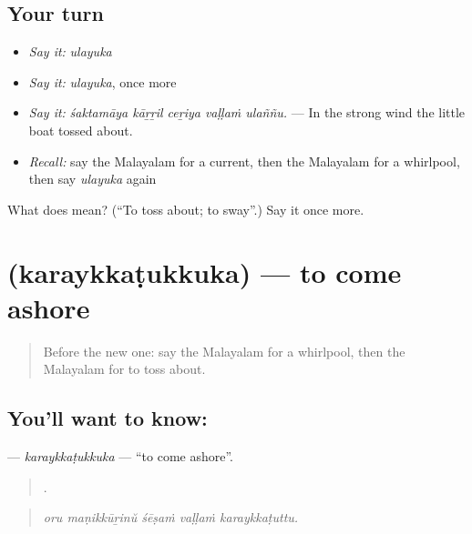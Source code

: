 \subsection*{Your turn}
\begin{itemize}
\raggedright
  \item \emph{Say it:} \emph{ulayuka}
  \item \emph{Say it:} \emph{ulayuka}, once more
  \item \emph{Say it:} \emph{śaktamāya kāṟṟil ceṟiya vaḷḷaṁ ulaññu.} — In the strong wind the little boat tossed about.
  \item \emph{Recall:} say the Malayalam for a current, then the Malayalam for a whirlpool, then say \emph{ulayuka} again
\end{itemize}

\begin{tcolorbox}[breakable,colback=teal!4,colframe=teal!35!black,title={Before you move on}]
What does  mean? (\textquotedblleft{}To toss about; to sway\textquotedblright{}.) Say it once more.
\end{tcolorbox}
\section[\texorpdfstring{\ml{കരയ്ക്കടുക്കുക} (karaykkaṭukkuka)}{കരയ്ക്കടുക്കുക (karaykkaṭukkuka)}]{ (karaykkaṭukkuka) — to come ashore}

\label{lesson:ML-C476-karaykkatukkuka}



\begin{quote}
Before the new one: say the Malayalam for a whirlpool, then the Malayalam for to toss about.
\end{quote}

\subsection*{You'll want to know: }
\textbf{} — \emph{karaykkaṭukkuka} — \textquotedblleft{}to come ashore\textquotedblright{}.

\begin{quote}
    .
\end{quote}

\begin{quote}
\emph{oru maṇikkūṟinŭ śēṣaṁ vaḷḷaṁ karaykkaṭuttu.}
\end{quote}

